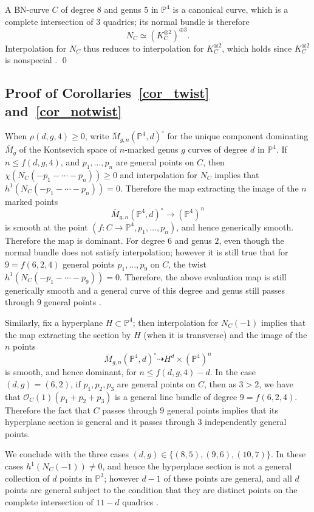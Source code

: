 \documentclass[11pt]{amsart}
\newcommand{\pp}{\mathbb{P}}
\renewcommand{\O}{\mathcal{O}}
\renewcommand{\bar}{\overline}
\theoremstyle{definition}
\theoremstyle{remark}
\begin{document}
A BN-curve $C$ of degree $8$ and genus $5$ in $\pp^4$ is a canonical curve,
which is a complete intersection of $3$ quadrics; its normal bundle is therefore
\[N_C \simeq (K_C^{\otimes 2})^{\oplus 3}. \]
Interpolation for $N_C$ thus reduces to interpolation
for
$K_C^{\otimes 2}$, which holds since $K_C^{\otimes 2}$ is nonspecial \cite[Proposition 4.7]{joint}.
\qed


\subsection{Proof of Corollaries~\ref{cor_twist} and~\ref{cor_notwist} }

When $\rho(d,g,4) \geq 0$, write $\bar{M}_{g,n}(\pp^4, d)^\circ$ for the unique component dominating $\bar{M}_g$ of the Kontsevich space of $n$-marked genus $g$ curves of degree $d$ in $\pp^4$.  If $n \leq f(d,g,4)$, and $p_1, \ldots, p_n$ are general points on $C$, then $\chi(N_C(-p_1-\cdots-p_n)) \geq 0$ and interpolation for $N_C$ implies that $h^1(N_C(-p_1-\cdots-p_n)) = 0$.  Therefore the map extracting the image of the $n$ marked points
\[\bar{M}_{g,n}(\pp^4, d)^\circ \to (\pp^4)^n \]
is smooth at the point $(f \colon C \to \pp^4, p_1, \ldots, p_n)$, and hence generically smooth.  Therefore the map is dominant.  For degree $6$ and genus $2$, even though the normal bundle does not satisfy interpolation; however it is still true that for $9 = f(6,2,4)$ general points $p_1, \ldots, p_9$ on $C$, the twist $h^1(N_C(-p_1-\cdots -p_9))=0$.  Therefore, the above evaluation map is still generically smooth and a general curve of this degree and genus still passes through $9$ general points \cite[Corollary 1.4]{joint}.

Similarly, fix a hyperplane $H \subset \pp^4$; then interpolation for $N_C(-1)$ implies that the map extracting the section by $H$ (when it is transverse) and the image of the $n$ points
\[ \bar{M}_{g,n}(\pp^4, d)^\circ \dashrightarrow H^d \times (\pp^4)^n \]
is smooth, and hence dominant, for $n \leq f(d,g,4) - d$.  In the case $(d,g)=(6,2)$, if $p_1, p_2, p_3$ are general points on $C$, then as $3 > 2$, we have that $\O_C(1)(p_1 + p_2 + p_3)$ is a general line bundle of degree $9 = f(6,2,4)$.  Therefore the fact that $C$ passes through $9$ general points implies that its hyperplane section is general and it passes through $3$ independently general points.

We conclude with the three cases $(d,g) \in \{(8,5), (9,6), (10,7)\}$.  In these cases $h^1(N_C(-1)) \neq 0$, and hence the hyperplane section is not a general collection of $d$ points in $\pp^3$; however $d-1$ of these points are general, and all $d$ points are general subject to the condition that they are distinct points
on the complete intersection of $11 - d$ quadrics
\cite[Theorem 1.6]{quadrics}.
\end{document}
